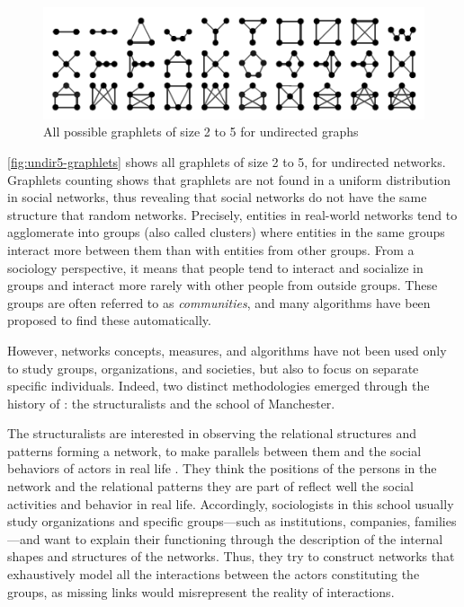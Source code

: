 
\begin{figure}
    \centering %
    \includegraphics[width=1\textwidth]{static/figures/RelatedWork/all_graphlets_undir5}
    \caption{All possible graphlets of size 2 to 5 for undirected graphs}
    \label{fig:undir5-graphlets}
\end{figure}

\autoref{fig:undir5-graphlets} shows all graphlets of size 2 to 5, for undirected networks.
Graphlets counting shows that graphlets are not found in a uniform distribution in social networks\cite{charbeyStarsHolesPaths2019}, thus revealing that social networks do not have the same structure that random networks.
Precisely, entities in real-world networks tend to agglomerate into groups (also called clusters) where entities in the same groups interact more between them than with entities from other groups\cite{girvanCommunityStructureSocial2002}.
From a sociology perspective, it means that people tend to interact and socialize in groups and interact more rarely with other people from outside groups.
These groups are often referred to as \emph{communities}, and many algorithms have been proposed to find these automatically\cite{fortunatoCommunityDetectionGraphs2010}.

However, networks concepts, measures, and algorithms have not been used only to study groups, organizations, and societies, but also to focus on separate specific individuals.
Indeed, two distinct methodologies emerged through the history of \sna: the structuralists and the school of Manchester\cite{eveDeuxTraditionsAnalyse2002, maurizio2000, freemanDevelopmentSocialNetwork2004}.

The structuralists are interested in observing the relational structures and patterns forming a network, to make parallels between them and the social behaviors of actors in real life \cite{lazegaReseaux}.
They think the positions of the persons in the network and the relational patterns they are part of reflect well the social activities and behavior in real life.
Accordingly, sociologists in this school usually study organizations and specific groups---such as institutions, companies, families---and want to explain their functioning through the description of the internal shapes and structures of the networks.
Thus, they try to construct networks that exhaustively model all the interactions between the actors constituting the groups, as missing links would misrepresent the reality of interactions.

